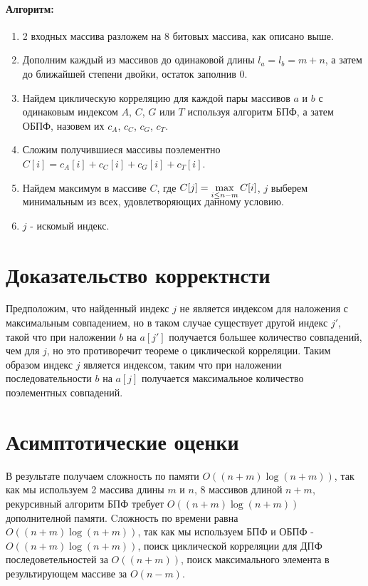 \documentclass[12pt]{article}
\begin{document}
\paragraph{Алгоритм:}

\begin{enumerate}

\item 2 входных массива разложем на 8 битовых массива, как описано выше.

\item Дополним каждый из массивов до одинаковой длины $l_a = l_b = m + n $, а затем до ближайшей степени двойки, остаток заполнив 0.

\item Найдем циклическую корреляцию для каждой пары массивов $a$ и $b$ с одинаковым индексом $A$, $C$, $G$ или $T$ используя алгоритм БПФ, а затем ОБПФ, назовем их $c_A$, $c_C$, $c_G$, $c_T$.

\item Сложим получившиеся массивы поэлементно $C[i] = c_A[i] + c_C[i] + c_G[i] + c_T[i]$.

\item Найдем максимум в массиве $C$, где $C[j] = \smash{\displaystyle\max_{i \leq n-m} C[i]}$, $j$ выберем минимальным из всех, удовлетворяющих данному условию.

\item $j$ - искомый индекс.
	
\end{enumerate}
	



\section{Доказательство корректнсти}
Предположим, что найденный индекс $j$ не является индексом для наложения с максимальным совпадением, но в таком случае существует другой индекс $j'$, такой что при наложении $b$ на $a[j']$ получается большее количество совпадений, чем  для $j$, но это противоречит теореме о циклической корреляции.
Таким образом индекс $j$ является индексом, таким что при наложении последовательности $b$ на $a[j]$ получается максимальное количество поэлементных совпадений.


\section{Асимптотические оценки}
В результате получаем сложность по памяти $O((n+m) \log (n+m))$, так как мы используем 2 массива длины $m$ и $n$, 8 массивов длиной $n+m$, рекурсивный алгоритм БПФ требует $O((n+m) \log (n+m))$ дополнителной памяти. Cложность по времени равна $O((n+m)\log (n+m))$, так как мы используем БПФ и ОБПФ - $O((n+m)\log (n+m))$, поиск циклической корреляции для ДПФ последоветельностей за $O((n+m))$, поиск максимального элемента в результирующем массиве за $O(n-m)$.
\end{document}
